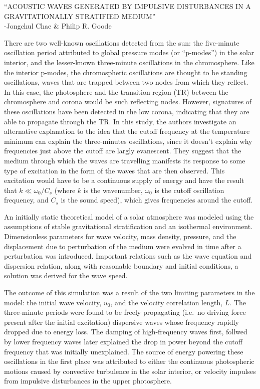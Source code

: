 \documentclass[12pt]{article}
\begin{document}
\begin{center}
    ``ACOUSTIC WAVES GENERATED BY IMPULSIVE DISTURBANCES IN A
    GRAVITATIONALLY STRATIFIED MEDIUM''\\
    -Jongchul Chae \& Philip R. Goode
\end{center}


There are two well-known oscillations detected from the sun: the five-minute
oscillation period attributed to global pressure modes (or ``p-modes'')
in the solar interior, and the
lesser-known three-minute oscillations in the chromosphere.
Like the interior p-modes, the chromospheric oscillations are thought to
be standing oscillations, waves that are trapped between two nodes from which
they reflect.
In this case, the photosphere and the transition region (TR) between the
chromosphere and corona would be such reflecting nodes. However, signatures
of these oscillations have been detected in the low corona, indicating that
they are able to propagate through the TR\@.
In this study, the authors
investigate an alternative explanation to the idea that the cutoff frequency
at the temperature minimum can explain the three-minutes oscillations, since
it doesn't explain why
frequencies just above the cutoff are largly evanescent.
They suggest that the medium through which the waves are
travelling manifests its response to some type of excitation
in the form of the waves that are then observed. This excitation would have
to be a continuous supply of energy and have the result that
$k \ll \omega_0/C_s$ (where $k$ is the wavenumber, $\omega_0$ is the cutoff
oscillation frequency, and $C_s$ is the sound speed), which gives frequencies around
the cutoff.

An initially static theoretical model of a solar atmosphere was
modeled using the assumptions of stable gravitational stratification
and an isothermal environment.
Dimensionless parameters for wave velocity,
mass density, pressure, and the displacement due to perturbation
of the medium were evolved in time after a perturbation was
introduced.
Important relations such as the wave equation and
dispersion relation, along with reasonable boundary and initial
conditions, a solution was derived for the wave speed.

The outcome of this simulation was a result of the two limiting
parameters in the model: the initial wave velocity, $u_0$, and the
velocity correlation length, $L$.
The three-minute periods were found to be freely propagating
(i.e.\ no driving force present after the initial excitation)
dispersive waves
whose frequency rapidly dropped due to energy loss. The damping of
high-frequency waves first, follwed by lower frequency waves later
explained the drop in power beyond the cutoff frequency that was
initially unexplained. The source of energy powering these
oscillations in the first place was attributed to either the continuous
photospheric motions caused by convective turbulence
in the solar interior, or velocity impulses from impulsive disturbances
in the upper photosphere.

%
\end{document}
